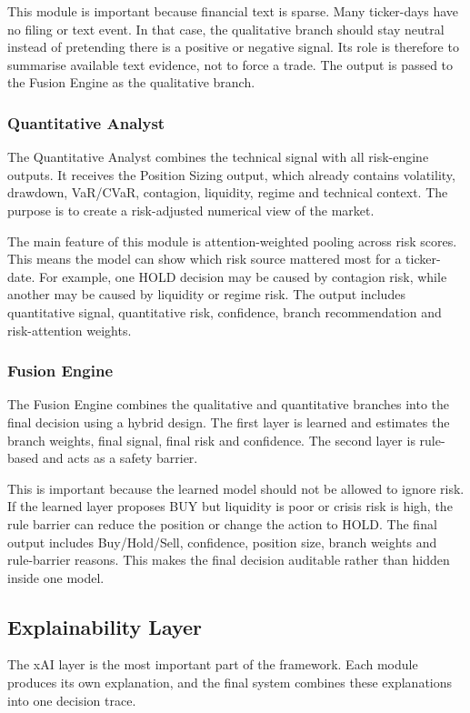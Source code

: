 \documentclass[conference]{IEEEtran}
\begin{document}
This module is important because financial text is sparse. Many ticker-days have no filing or text event. In that case, the qualitative branch should stay neutral instead of pretending there is a positive or negative signal. Its role is therefore to summarise available text evidence, not to force a trade. The output is passed to the Fusion Engine as the qualitative branch.

\subsubsection{Quantitative Analyst}
The Quantitative Analyst combines the technical signal with all risk-engine outputs. It receives the Position Sizing output, which already contains volatility, drawdown, VaR/CVaR, contagion, liquidity, regime and technical context. The purpose is to create a risk-adjusted numerical view of the market.

The main feature of this module is attention-weighted pooling across risk scores. This means the model can show which risk source mattered most for a ticker-date. For example, one HOLD decision may be caused by contagion risk, while another may be caused by liquidity or regime risk. The output includes quantitative signal, quantitative risk, confidence, branch recommendation and risk-attention weights.

\subsubsection{Fusion Engine}
The Fusion Engine combines the qualitative and quantitative branches into the final decision using a hybrid design. The first layer is learned and estimates the branch weights, final signal, final risk and confidence. The second layer is rule-based and acts as a safety barrier.

This is important because the learned model should not be allowed to ignore risk. If the learned layer proposes BUY but liquidity is poor or crisis risk is high, the rule barrier can reduce the position or change the action to HOLD. The final output includes Buy/Hold/Sell, confidence, position size, branch weights and rule-barrier reasons. This makes the final decision auditable rather than hidden inside one model.

\subsection{Explainability Layer}
The xAI layer is the most important part of the framework. Each module produces its own explanation, and the final system combines these explanations into one decision trace.
\end{document}
